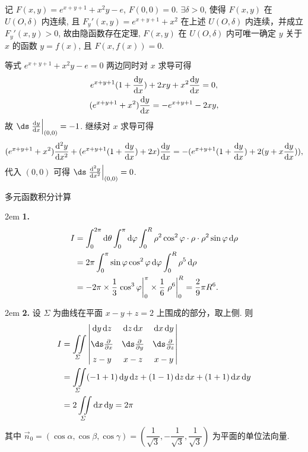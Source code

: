 \documentclass[UTF8,14pt,normal]{ctexart}
\begin{document}
    记 \(F(x, y) = e^{x + y + 1} + x^2y - e\), \(F(0, 0) = 0\). \(\exists \delta > 0\), 使得 \(F(x, y)\) 在 \(U(O, \delta)\) 内连续, 且 \(F_y'(x, y) = e^{x + y + 1} + x^2\) 在上述 \(U(O, \delta)\) 内连续，并成立 \(F_y'(x, y) > 0\), 故由隐函数存在定理, \(F(x, y)\) 在 \(U(O, \delta)\) 内可唯一确定 \(y\) 关于 \(x\) 的函数 \(y = f(x)\), 且 \(F(x, f(x)) = 0\).

    等式 \(e^{x + y + 1} + x^2y - e = 0\) 两边同时对 \(x\) 求导可得
    \begin{gather*}
        e^{x + y + 1} (1 + \dv{y}{x}) + 2xy + x^2 \dv{y}{x} = 0, \\
        (e^{x + y + 1} + x^2) \dv{y}{x} = -e^{x + y + 1} - 2xy, \\
    \end{gather*}
    故 \(\ds \eval{\dv{y}{x}}_{(0, 0)} = -1\).
    继续对 \(x\) 求导可得
    \[
        (e^{x + y + 1} + x^2) \dv[2]{y}{x} + (e^{x + y + 1} (1 + \dv{y}{x}) + 2x) \dv{y}{x} = -(e^{x + y + 1}(1 + \dv{y}{x}) + 2(y + x\dv{y}{x})),
    \]
    代入 \((0, 0)\) 可得 \(\ds \eval{\dv[2]{y}{x}}_{(0, 0)} = 0\).

 多元函数积分计算

    \hangindent 2em
    \noindent
    \textbf{1.}
    \begin{align*}
        I & = \int_{0}^{2\pi} \dd{\theta} \int_{0}^{\pi} \dd{\varphi} \int_{0}^{R} \rho^2 \cos^2 \varphi \cdot \rho \cdot \rho^2 \sin \varphi \dd{\rho} \\
        & = 2\pi \int_{0}^{\pi} \sin \varphi \cos^2 \varphi \dd{\varphi} \int_{0}^{R} \rho^5 \dd{\rho} \\
        & = -2\pi \times \dfrac{1}{3} \eval{\cos^3 \varphi}_{0}^{\pi} \times \dfrac{1}{6} \eval{\rho^6}_{0}^{R} = \dfrac{2}{9} \pi R^6.
    \end{align*}

    \hangindent 2em
    \noindent
    \textbf{2.}
    设 \(\varSigma\) 为曲线在平面 \(x - y + z = 2\) 上围成的部分，取上侧. 则
    \begin{align*}
        I & = \iint\limits_\varSigma \begin{vmatrix}
            \dd{y} \dd{z} & \dd{z} \dd{x} & \dd{x} \dd{y} \\[1.5ex]
            \ds\pdv{x} & \ds\pdv{y} & \ds\pdv{z} \\[1.5ex]
            z - y & x - z & x - y
        \end{vmatrix} \\
        & = \iint\limits_\varSigma (-1 + 1) \dd{y} \dd{z} + (1 - 1) \dd{z} \dd{x} + (1 + 1) \dd{x} \dd{y} \\
        & = 2 \iint\limits_\varSigma \dd{x} \dd{y} = 2\pi
    \end{align*}
    其中 \(\vec{n}_0 = (\cos \alpha, \cos \beta, \cos \gamma) = (\dfrac{1}{\sqrt{3}}, -\dfrac{1}{\sqrt{3}}, \dfrac{1}{\sqrt{3}})\) 为平面的单位法向量.
\end{document}
